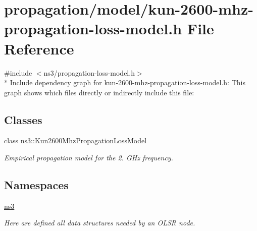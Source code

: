 \hypertarget{kun-2600-mhz-propagation-loss-model_8h}{}\section{propagation/model/kun-\/2600-\/mhz-\/propagation-\/loss-\/model.h File Reference}
\label{kun-2600-mhz-propagation-loss-model_8h}
{\ttfamily \#include $<$ns3/propagation-\/loss-\/model.\+h$>$}\\*
Include dependency graph for kun-\/2600-\/mhz-\/propagation-\/loss-\/model.h\+:
This graph shows which files directly or indirectly include this file\+:
\subsection*{Classes}
\begin{DoxyCompactItemize}
\item 
class \hyperlink{classns3_1_1Kun2600MhzPropagationLossModel}{ns3\+::\+Kun2600\+Mhz\+Propagation\+Loss\+Model}
\begin{DoxyCompactList}\small\item\em Empirical propagation model for the 2. G\+Hz frequency. \end{DoxyCompactList}\end{DoxyCompactItemize}
\subsection*{Namespaces}
\begin{DoxyCompactItemize}
\item 
 \hyperlink{namespacens3}{ns3}
\begin{DoxyCompactList}\small\item\em Here are defined all data structures needed by an O\+L\+SR node. \end{DoxyCompactList}\end{DoxyCompactItemize}
